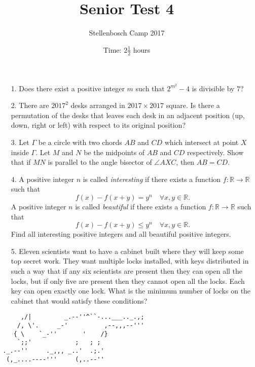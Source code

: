 \documentclass[12pt]{article}
\title{Senior Test 4}
\author{Stellenbosch Camp 2017}
\date{Time: $2\frac{1}{2}$ hours}
\begin{document}
 \maketitle

\begin{enumerate}

\item[1.] %
Does there exist a positive integer $m$ such that $2^{m^2} - 4$ is divisible by $7$?


\item[2.] %
There are $2017^2$ desks arranged in $2017 \times 2017$ square. Is there a permutation of the desks that leaves each desk in an adjacent position (up, down, right or left) with respect to its original position?


\item[3.] %
Let $\Gamma$ be a circle with two chords $AB$ and $CD$ which intersect at point $X$ inside $\Gamma$. Let $M$ and $N$ be the midpoints of $AB$ and $CD$ respectively. Show that if $MN$ is parallel to the angle bisector of $\angle AXC$, then $AB = CD$.


\item[4.] %
A positive integer $n$ is called \emph{interesting} if there exists a function $f : \mathbb{R} \to \mathbb{R}$ such that
  \[ f(x) - f(x+y) = y^n \quad \forall x,y \in \mathbb{R}. \]
A positive integer $n$ is called \emph{beautiful} if there exists a function $f : \mathbb{R} \to\mathbb{R}$ such that
  \[ f(x) - f(x+y) \leq y^n \quad \forall x,y \in \mathbb{R}. \]
Find all interesting positive integers and all beautiful positive integers.
 

\item[5.] %
Eleven scientists want to have a cabinet built where they will keep some top secret work. They want multiple locks installed, with keys distributed in such a way that if any six scientists are present then they can open all the locks, but if only five are present then they cannot open all the locks. Each key can open exactly one lock. What is the minimum number of locks on the cabinet that would satisfy these conditions?


\end{enumerate}

\vfill

\centering
\begin{BVerbatim}
      ,/|         _.--''^``-...___.._.,;
     /, \'.     _-'          ,--,,,--'''
    { \    `_-''       '    /}
     `;;'            ;   ; ;
 ._.--''     ._,,, _..'  .;.'
  (,_....----'''     (,..--''
\end{BVerbatim}
\end{document}
